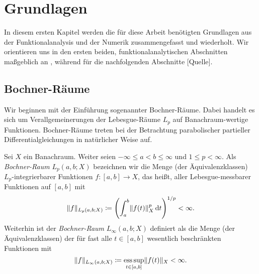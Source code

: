 
\iftoggle{dictum}{
    \setchapterpreamble[ul][0.6\textwidth]{%
        \dictum[Iain M. Banks, \textit{The Algebraist}]{\enquote{Elegance is an algorithm.}}
        \vspace*{2\baselineskip}
    }
}{}
\chapter{Grundlagen} %
\label{cha:gl:grundlagen}


In diesem ersten Kapitel werden die für diese Arbeit benötigten Grundlagen aus der Funktionalanalysis und der Numerik zusammengefasst und wiederholt.
Wir orientieren uns in den ersten beiden, funktionalanalytischen Abschnitten maßgeblich an \textcite{Dautray:1992by,Lions:1972tg}, während für die nachfolgenden Abschnitte [Quelle].


\section{Bochner-Räume} %
\label{sec:gl:br:bochner_raeume}

Wir beginnen mit der Einführung sogenannter Bochner-Räume.
Dabei handelt es sich um Verallgemeinerungen der Lebesgue-Räume $L_{p}$ auf Banachraum-wertige Funktionen.
Bochner-Räume treten bei der Betrachtung parabolischer partieller Differentialgleichungen in natürlicher Weise auf.

\begin{Definition}
\label{def:gl:br:bochner_raum}
    Sei $X$ ein Banachraum.
    Weiter seien $- \infty \leq a < b \leq \infty$ und $1 \leq p < \infty$.
    Als \emph{Bochner-Raum} $L_{p}(a, b; X)$ bezeichnen wir die Menge (der Äquivalenzklassen) $L_{p}$-integrierbarer Funktionen $f \colon [a, b] \to X$, das heißt, aller Lebesgue-messbarer Funktionen auf $[a, b]$ mit
    \begin{equation}
        \lVert f\rVert_{L_{p}(a, b; X)} \coloneqq \left( \int_{a}^{b} \lVert f(t)\rVert_{X}^{p} \mathop{}\!\mathrm{d} t \right)^{1 / p} < \infty.
    \end{equation}
    Weiterhin ist der \emph{Bochner-Raum} $L_{\infty}(a, b; X)$ definiert als die Menge (der Äquivalenzklassen) der für fast alle $t \in [a, b]$ wesentlich beschränkten Funktionen mit
    \begin{equation}
        \lVert f\rVert_{L_{\infty}(a, b; X)} \coloneqq \operatorname*{ess\,sup}_{t \in [a, b]} \lVert f(t)\rVert_{X} < \infty.
    \end{equation}
\end{Definition}

